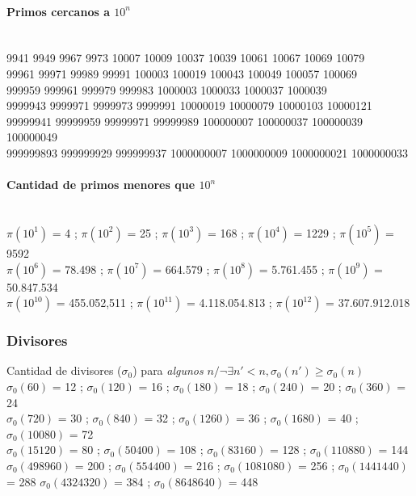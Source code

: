 \documentclass[10pt, landscape, twocolumn, a4paper, notitlepage]{article}
\begin{document}
\paragraph{Primos cercanos a $10^n$}\ \\
9941 9949 9967 9973 10007 10009 10037 10039 10061 10067 10069 10079\\
99961 99971 99989 99991 100003 100019 100043 100049 100057 100069\\
999959 999961 999979 999983 1000003 1000033 1000037 1000039\\
9999943 9999971 9999973 9999991 10000019 10000079 10000103 10000121\\
99999941 99999959 99999971 99999989 100000007 100000037 100000039 100000049\\
999999893 999999929 999999937 1000000007 1000000009 1000000021 1000000033

\paragraph{Cantidad de primos menores que $10^n$}\ \\
$\pi(10^1)$ = 4 ;
$\pi(10^2)$ = 25 ;
$\pi(10^3)$ = 168 ;
$\pi(10^4)$ = 1229 ;
$\pi(10^5)$ = 9592 \\
$\pi(10^6)$ = 78.498 ;
$\pi(10^7)$ = 664.579 ;
$\pi(10^8)$ = 5.761.455 ;
$\pi(10^9)$ = 50.847.534 \\
$\pi(10^{10})$ = 455.052,511 ;
$\pi(10^{11})$ = 4.118.054.813 ;
$\pi(10^{12})$ = 37.607.912.018%

\subsubsection{Divisores}
Cantidad de divisores ($\sigma_0$) para \emph{algunos} $n / \neg\exists n'<n, \sigma_0(n') \geqslant \sigma_0(n)$ \\
$\sigma_0(60)$ = 12 ; $\sigma_0(120)$ = 16 ; $\sigma_0(180)$ = 18 ; $\sigma_0(240)$ = 20 ; $\sigma_0(360)$ = 24 \\
$\sigma_0(720)$ = 30 ; $\sigma_0(840)$ = 32 ; $\sigma_0(1260)$ = 36 ; $\sigma_0(1680)$ = 40 ; $\sigma_0(10080)$ = 72 \\ $\sigma_0(15120)$ = 80 ; $\sigma_0(50400)$ = 108 ; $\sigma_0(83160)$ = 128 ; $\sigma_0(110880)$ = 144 \\
$\sigma_0(498960)$ = 200 ; $\sigma_0(554400)$ = 216 ; $\sigma_0(1081080)$ = 256 ; $\sigma_0(1441440)$ = 288  $\sigma_0(4324320)$ = 384 ; $\sigma_0(8648640)$ = 448
\end{document}
